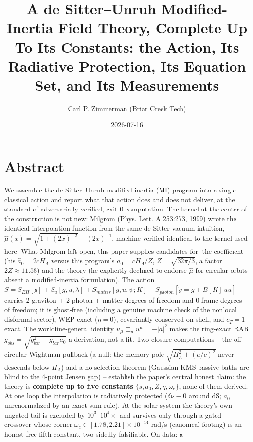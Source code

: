\documentclass[
]{article}
\title{A de Sitter--Unruh Modified-Inertia Field Theory, Complete Up To
Its Constants: the Action, Its Radiative Protection, Its Equation Set,
and Its Measurements}
\author{Carl P. Zimmerman (Briar Creek Tech)}
\date{2026-07-16}
\newcounter{none} %
\begin{document}
\maketitle

\section{Abstract}\label{abstract}

We assemble the de Sitter--Unruh modified-inertia (MI) program into a
single classical action and report what that action does and does not
deliver, at the standard of adversarially verified, exit-0 computation.
The kernel at the center of the construction is not new: Milgrom (Phys.
Lett. A 253:273, 1999) wrote the identical interpolation function from
the same de Sitter-vacuum intuition,
\(\hat\mu(x)=\sqrt{1+(2x)^{-2}}-(2x)^{-1}\), machine-verified identical
to the kernel used here. What Milgrom left open, this paper supplies
candidates for: the coefficient (his \(\hat a_0 = 2cH_\Lambda\) versus
this program's \(a_0 = cH_\Lambda/Z\), \(Z=\sqrt{32\pi/3}\), a factor
\(2Z\approx 11.58\)) and the theory (he explicitly declined to endorse
\(\hat\mu\) for circular orbits absent a modified-inertia formulation).
The action
\(S = S_{EH}[g] + S_u[g,u,\lambda] + S_{matter}[g,u,\psi;K] + S_{photon}[\tilde g = g + B[K]\,u u]\)
carries 2 graviton + 2 photon + matter degrees of freedom and 0 frame
degrees of freedom; it is ghost-free (including a genuine machine check
of the nonlocal disformal sector), WEP-exact (\(\eta=0\)), covariantly
conserved on-shell, and \(c_T=1\) exact. The worldline-general identity
\(u_\mu \Box_u u^\mu = -|a|^2\) makes the ring-exact RAR
\(g_{obs}=\sqrt{g_{bar}^2+g_{bar}a_0}\) a derivation, not a fit. Two
closure computations -- the off-circular Wightman pullback (a null: the
memory pole \(\sqrt{H_\Lambda^2+(a/c)^2}\) never descends below
\(H_\Lambda\)) and a no-selection theorem (Gaussian KMS-passive baths
are blind to the 4-point Jensen gap) -- establish the paper's central
honest claim: the theory is \textbf{complete up to five constants}
\(\{s, a_0, Z, \eta, \omega_c\}\), none of them derived. At one loop the
interpolation is radiatively protected (\(\delta\nu \equiv 0\) around
dS; \(a_0\) unrenormalized by an exact sum rule). At the solar system
the theory's own ungated tail is excluded by \(10^3\)--\(10^4\times\)
and survives only through a gated crossover whose corner
\(\omega_c \in [1.78, 2.21]\times 10^{-14}\) rad/s (canonical footing)
is an honest free fifth constant, two-sidedly falsifiable. On data: a
\end{document}
